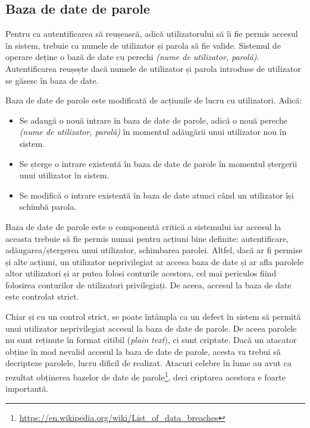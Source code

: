 \subsection{Baza de date de parole}
\label{sec:user:password-db}

Pentru ca autentificarea să reușească, adică utilizatorului să îi fie permis
accesul în sistem, trebuie ca numele de utilizator și parola să fie valide.
Sistemul de operare deține o bază de date cu perechi \textit{(nume de utilizator,
parolă)}. Autentificarea reușește dacă numele de utilizator și parola introduse
de utilizator se găsesc în baza de date.

Baza de date de parole este modificată de acțiunile de lucru cu utilizatori. Adică:

\begin{itemize}
  \item Se adaugă o nouă intrare în baza de date de parole, adică o nouă
    pereche \textit{(nume de utilizator, parolă)} în momentul adăugării unui
          utilizator nou în sistem.
  \item Se șterge o intrare existentă în baza de date de parole în
          momentul ștergerii unui utilizator în sistem.
  \item Se modifică o intrare existentă în baza de date atunci când un
          utilizator își schimbă parola.
\end{itemize}

Baza de date de parole este o componentă critică a sistemului iar accesul la
aceasta trebuie să fie permis numai pentru acțiuni bine definite: autentificare,
adăugarea/ștergerea unui utilizator, schimbarea parolei. Altfel, dacă ar fi
permise și alte acțiuni, un utilizator neprivilegiat ar accesa baza de date și
ar afla parolele altor utilizatori și ar putea folosi conturile acestora, cel
mai periculos fiind folosirea conturilor de utilizatori privilegiați. De aceea,
accesul la baza de date este controlat strict.

Chiar și cu un control strict, se poate întâmpla ca un defect în sistem să
permită unui utilizator neprivilegiat accesul la baza de date de parole. De
aceea parolele nu sunt reținute în format citibil (\textit{plain text}), ci sunt criptate.
Dacă un atacator obține în mod nevalid accesul la baza de date de parole, acesta
va trebui să decripteze parolele, lucru dificil de realizat. Atacuri celebre în
lume au avut ca rezultat obținerea bazelor de date de
parole\footnote{\url{https://en.wikipedia.org/wiki/List\_of\_data\_breaches}}, deci
criptarea acestora e foarte importantă.


